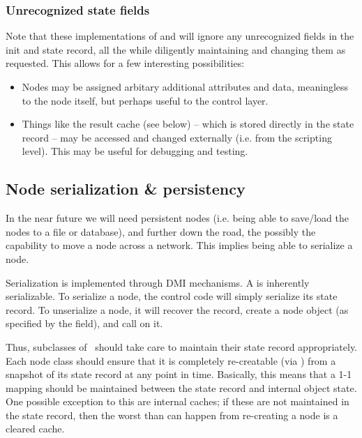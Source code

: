 \documentclass[10pt]{article}
\begin{document}
\subsubsection{Unrecognized state fields}

  Note that these implementations of  and  will
  ignore any unrecognized fields in the init and state record, all the while 
  diligently maintaining and changing them as requested. This allows for a few
  interesting possibilities:

  \begin{itemize}
  
  \item Nodes may be assigned arbitary additional attributes and data,
    meaningless to the node itself, but perhaps useful to the control layer.

  \item Things like the result cache (see below) -- which is stored directly in
    the state record -- may be accessed and changed externally (i.e. from the
    scripting level). This may be useful for debugging and testing.

  \end{itemize}

\subsection{Node serialization \& persistency}

  In the near future we will need persistent nodes (i.e. being able to
  save/load the nodes to a file or database), and further down the road, the
  possibly the capability to move a node across a network. This implies being
  able to serialize a node.
  
  Serialization is implemented through DMI mechanisms. A  is
  inherently serializable. To serialize a node, the control code will simply
  serialize its state record. To unserialize a node, it will recover the
  record, create a node object (as specified by the  field), and call
   on it. 

  Thus, subclasses of \Node\ should take care to maintain their state record
  appropriately. Each node class should ensure that it is completely
  re-creatable (via ) from a snapshot of its state record at any
  point in time. Basically, this means that a 1-1 mapping should be maintained
  between the state record and internal object state. One possible exception to
  this are internal caches; if these are not maintained in the state record,
  then the worst than can happen from re-creating a node is a cleared cache.
\end{document}
